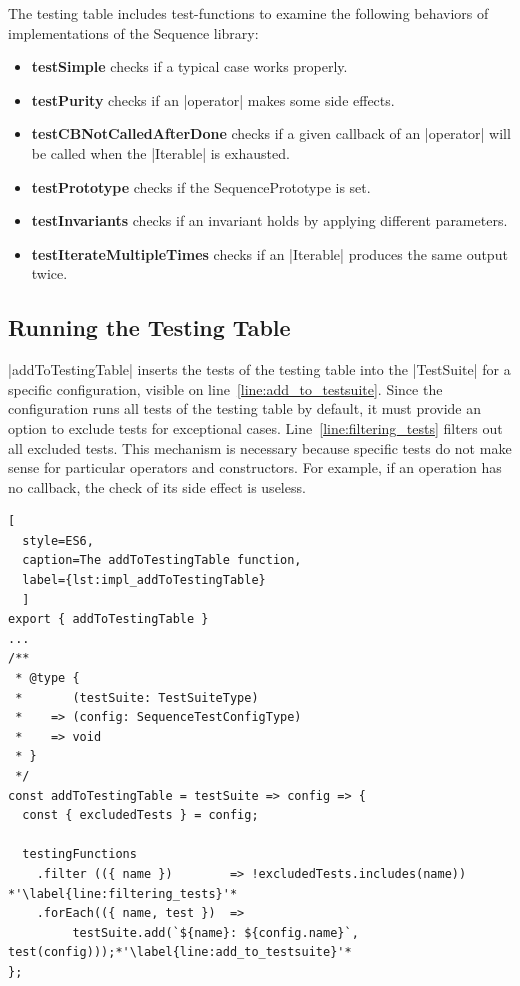 The testing table includes test-functions to examine the following behaviors of
implementations of the Sequence library:

\begin{itemize}
  \item{\textbf{testSimple} checks if a typical case works properly.}
  \item{\textbf{testPurity} checks if an |operator| makes some side effects.}
  \item{\textbf{testCBNotCalledAfterDone} checks if a given callback of an
    |operator| will be called when the |Iterable| is exhausted.}
  \item{\textbf{testPrototype} checks if the SequencePrototype is set.}
  \item{\textbf{testInvariants} checks if an invariant holds by applying different parameters.}
  \item{\textbf{testIterateMultipleTimes} checks if an |Iterable| produces the same output twice.}
\end{itemize}


\subsection{Running the Testing Table}
\label{sub:Running the Testing Table}
|addToTestingTable| inserts the tests of the testing table into the |TestSuite| for a
specific configuration, visible on line~\ref{line:add_to_testsuite}. 
Since the configuration runs all tests of the testing table by default, it
must provide an option to exclude tests for exceptional cases. 
Line~\ref{line:filtering_tests} filters out all excluded tests.
This mechanism is necessary because specific tests do not make sense for 
particular operators and constructors. For example, if an operation has no
callback, the check of its side effect is useless.

\begin{lstlisting}[
  style=ES6, 
  caption=The addToTestingTable function,
  label={lst:impl_addToTestingTable}
  ]
export { addToTestingTable }
...
/**
 * @type {
 *       (testSuite: TestSuiteType)
 *    => (config: SequenceTestConfigType)
 *    => void
 * }
 */
const addToTestingTable = testSuite => config => {
  const { excludedTests } = config;

  testingFunctions
    .filter (({ name })        => !excludedTests.includes(name)) *'\label{line:filtering_tests}'*
    .forEach(({ name, test })  => 
         testSuite.add(`${name}: ${config.name}`, test(config)));*'\label{line:add_to_testsuite}'*
};
\end{lstlisting}


